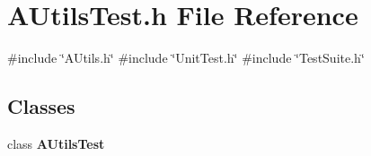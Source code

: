 \section{A\+Utils\+Test.\+h File Reference}
\label{AUtilsTest_8h}
{\ttfamily \#include \char`\"{}A\+Utils.\+h\char`\"{}}\newline
{\ttfamily \#include \char`\"{}Unit\+Test.\+h\char`\"{}}\newline
{\ttfamily \#include \char`\"{}Test\+Suite.\+h\char`\"{}}\newline
\subsection*{Classes}
\begin{DoxyCompactItemize}
\item 
class \textbf{ A\+Utils\+Test}
\end{DoxyCompactItemize}
